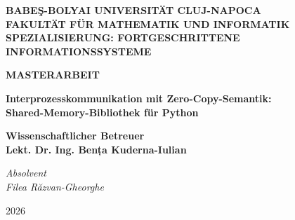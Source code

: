 \documentclass[12pt]{report}
\begin{document}
\begin{titlepage}
\begin{center}
{\Large\textbf{BABEŞ-BOLYAI UNIVERSITÄT CLUJ-NAPOCA}\\[1em]
\textbf{FAKULTÄT FÜR MATHEMATIK UND INFORMATIK}\\[1em]
\textbf{SPEZIALISIERUNG: FORTGESCHRITTENE INFORMATIONSSYSTEME}}
\end{center}

\vspace{10em}

\begin{center}
    \Huge\textbf{MASTERARBEIT}
\end{center}

\vspace{2em}

\begin{center}
    \Large\textbf{Interprozesskommunikation mit Zero-Copy-Semantik:\\[0.5em] Shared-Memory-Bibliothek für Python}
\end{center}

\vspace{7em}

\begin{flushleft}
{\Large\textbf{Wissenschaftlicher Betreuer \\ Lekt. Dr. Ing. Bența Kuderna-Iulian}}
\end{flushleft}

\vspace{3em}

\begin{flushright}
{\Large\textit{Absolvent\\ Filea Răzvan-Gheorghe}}
\end{flushright}

\vfill

\begin{center}
{\Large{2026}}
\end{center}
\end{titlepage}
\end{document}
